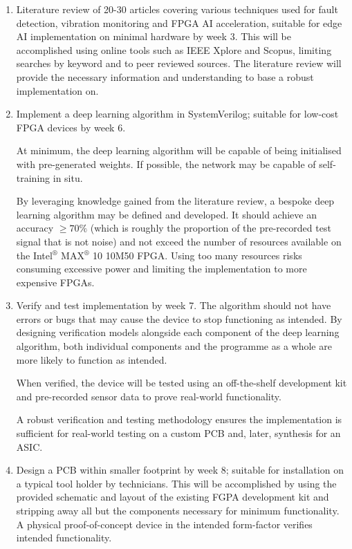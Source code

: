 \documentclass{article}
\begin{document}
\begin{enumerate}
    \item Literature review of 20-30 articles covering various techniques used for fault detection, vibration monitoring and FPGA AI acceleration, suitable for edge AI implementation on minimal hardware by week 3. This will be accomplished using online tools such as IEEE Xplore and Scopus, limiting searches by keyword and to peer reviewed sources. The literature review will provide the necessary information and understanding to base a robust implementation on. 

    \item Implement a deep learning algorithm in SystemVerilog; suitable for low-cost FPGA devices by week 6. 

    At minimum, the deep learning algorithm will be capable of being initialised with pre-generated weights. If possible, the network may be capable of self-training in situ. 
    
    By leveraging knowledge gained from the literature review, a bespoke deep learning algorithm may be defined and developed. It should achieve an accuracy $\ge70\%$ (which is roughly the proportion of the pre-recorded test signal that is not noise) and not exceed the number of resources available on the Intel$^{\circledR}$ MAX$^{\circledR}$ 10 10M50 FPGA. Using too many resources risks consuming excessive power and limiting the implementation to more expensive FPGAs. 

    \item Verify and test implementation by week 7. The algorithm should not have errors or bugs that may cause the device to stop functioning as intended. By designing verification models alongside each component of the deep learning algorithm, both individual components and the programme as a whole are more likely to function as intended. 

    When verified, the device will be tested using an off-the-shelf development kit and pre-recorded sensor data to prove real-world functionality.
    
    A robust verification and testing methodology ensures the implementation is sufficient for real-world testing on a custom PCB and, later, synthesis for an ASIC.
   \item Design a PCB within smaller footprint by week 8; suitable for installation on a typical tool holder by technicians. This will be accomplished by using the provided schematic and layout of the existing FGPA development kit and stripping away all but the components necessary for minimum functionality. A physical proof-of-concept device in the intended form-factor verifies intended functionality.


\end{enumerate}
\end{document}
